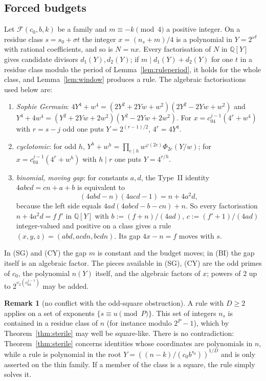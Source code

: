 \documentclass[11pt,reqno]{amsart}
\theoremstyle{definition}
\newtheorem{remark}[theorem]{Remark}
\newcommand{\Q}{\mathbb Q}
\begin{document}
\subsection{Forced budgets}
Let $\mathcal F(c_0,b,k)$ be a family and $m\equiv-k\pmod 4$ a positive
integer.  On a residue class $s=s_0+\sigma t$ the integer $x=(n_s+m)/4$ is
a polynomial in $Y=2^{\omega t}$ with rational coefficients, and so is
$N=nx$.  Every factorisation of $N$ in $\Q[Y]$ gives candidate divisors
$d_1(Y),d_2(Y)$; if $m\mid d_1(Y)+d_2(Y)$ for one $t$ in a residue class
modulo the period of Lemma~\ref{lem:ruleperiod}, it holds for the whole
class, and Lemma~\ref{lem:window} produces a rule.  The algebraic
factorisations used below are:
\begin{enumerate}
\item[(SG)] \emph{Sophie Germain}: $4Y^4+w^4=(2Y^2+2Yw+w^2)(2Y^2-2Yw+w^2)$
and $Y^4+4w^4=(Y^2+2Yw+2w^2)(Y^2-2Yw+2w^2)$.  For $x=c_04^{j-1}(4^r+w^4)$
with $r=s-j$ odd one puts $Y=2^{(r-1)/2}$, $4^r=4Y^4$.
\item[(CY)] \emph{cyclotomic}: for odd $h$,
$Y^h+w^h=\prod_{e\mid h}w^{\varphi(2e)}\Phi_{2e}(Y/w)$; for
$x=c_04^{j-1}(4^r+w^h)$ with $h\mid r$ one puts $Y=4^{r/h}$.
\item[(BI)] \emph{binomial, moving gap}: for constants $a,d$, the Type~II
identity $4abcd=cn+a+b$ is equivalent to
\begin{equation}\label{eq:binom}
 (4abd-n)(4acd-1)=n+4a^2d ,
\end{equation}
because the left side equals $4ad(4abcd-b-cn)+n$.  So every factorisation
$n+4a^2d=f\,f'$ in $\Q[Y]$ with $b:=(f+n)/(4ad)$, $c:=(f'+1)/(4ad)$
integer-valued and positive on a class gives a rule
$(x,y,z)=(abd,acdn,bcdn)$.  Its gap $4x-n=f$ moves with $s$.
\end{enumerate}
In (SG) and (CY) the gap $m$ is constant and the budget moves; in (BI) the
gap itself is an algebraic factor.  The pieces available in (SG), (CY) are
the odd primes of $c_0$, the polynomial $n(Y)$ itself, and the algebraic
factors of $x$; powers of $2$ up to $2^{v_2(c_04^{j-1})}$ may be added.

\begin{remark}[no conflict with the odd-square obstruction]\label{rem:T1window}
A rule with $D\ge2$ applies on a set of exponents $\{s\equiv u\pmod P\}$.
This set of integers $n_s$ is contained in a residue class of $n$ (for
instance modulo $2^P-1$), which by Theorem~\ref{thm:sterile} may well be
square-like.  There is no contradiction: Theorem~\ref{thm:sterile} concerns
identities whose coordinates are polynomials in $n$, while a rule is
polynomial in the root $Y=((n-k)/(c_0b^{s_0}))^{1/D}$ and is only asserted on
the thin family.  If a member of the class is a square, the
rule simply solves it.
\end{remark}
\end{document}
